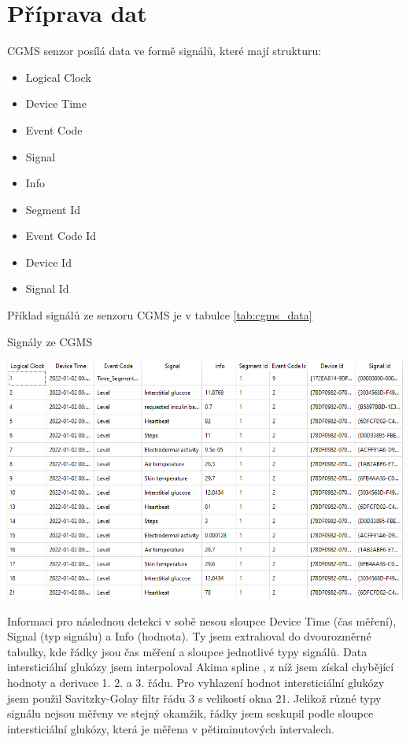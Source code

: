 \section{Příprava dat}

CGMS senzor posílá data ve formě signálů, které mají strukturu:
\begin{itemize}
\setlength\itemsep{0em}
\item Logical Clock
\item Device Time
\item Event Code
\item Signal
\item Info
\item Segment Id
\item Event Code Id
\item Device Id
\item Signal Id
\end{itemize}

Příklad signálů ze senzoru CGMS je v tabulce \ref{tab:cgms_data}

\begin{table}[H]
\caption{Signály ze CGMS}
\label{tab:cgms_data}
\centering
\includegraphics[width=1\textwidth]{img/cho/cgms_data.png}
\end{table}

Informaci pro následnou detekci v sobě nesou sloupce Device Time (čas měření), Signal (typ signálu) a Info (hodnota). Ty jsem extrahoval do dvourozměrné tabulky, kde řádky jsou čas měření a sloupce jednotlivé typy signálů.
Data intersticiální glukózy jsem interpoloval Akima spline \citep{cho.akima}, z níž jsem získal chybějící hodnoty a derivace 1. 2. a 3. řádu. Pro vyhlazení hodnot intersticiální glukózy jsem použil Savitzky-Golay filtr \citep{cho.savgol} řádu 3 s velikostí okna 21. Jelikož různé typy signálu nejsou měřeny ve stejný okamžik, řádky jsem seskupil podle sloupce intersticiální glukózy, která je měřena v pětiminutových intervalech.

